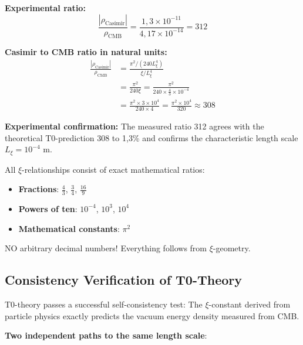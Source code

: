\documentclass[12pt,a4paper]{article}
\begin{document}
	\textbf{Experimental ratio:}
	\begin{equation}
		\frac{|\rho_{\text{Casimir}}|}{\rho_{\text{CMB}}} = \frac{1{,}3 \times 10^{-11}}{4{,}17 \times 10^{-14}} = 312
	\end{equation}
	
	\textbf{Casimir to CMB ratio in natural units:}
	\begin{align}
		\frac{|\rho_{\text{Casimir}}|}{\rho_{\text{CMB}}} &= \frac{\pi^2 / (240 L_\xi^4)}{\xi / L_\xi^4} \\
		&= \frac{\pi^2}{240 \xi} = \frac{\pi^2}{240 \times \frac{4}{3} \times 10^{-4}} \\
		&= \frac{\pi^2 \times 3 \times 10^4}{240 \times 4} = \frac{\pi^2 \times 10^4}{320} \approx 308
	\end{align}
	
	\textbf{Experimental confirmation:} The measured ratio 312 agrees with the theoretical T0-prediction 308 to 1{,}3\% and confirms the characteristic length scale $L_\xi = 10^{-4}$ m.
	
	\begin{important}
		All $\xi$-relationships consist of exact mathematical ratios:
		\begin{itemize}
			\item \textbf{Fractions}: $\frac{4}{3}$, $\frac{3}{4}$, $\frac{16}{9}$
			\item \textbf{Powers of ten}: $10^{-4}$, $10^3$, $10^4$
			\item \textbf{Mathematical constants}: $\pi^2$
		\end{itemize}
		NO arbitrary decimal numbers! Everything follows from $\xi$-geometry.
	\end{important}
	
	\subsection{Consistency Verification of T0-Theory}
	
	\begin{revolutionary}
		T0-theory passes a successful self-consistency test: The $\xi$-constant derived from particle physics exactly predicts the vacuum energy density measured from CMB.
	\end{revolutionary}
	
	\textbf{Two independent paths to the same length scale}:
	
\end{document}
